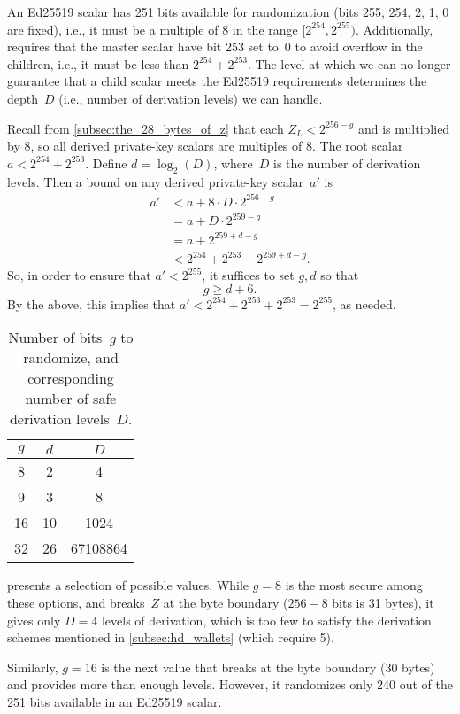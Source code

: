 \documentclass[12pt, a4paper, twocolumn]{article}
\begin{document}
An Ed25519 scalar has 251 bits available for randomization (bits 255, 254, 2, 1, 0 are fixed), i.e., it must be a multiple of 8 in the range $[2^{254},2^{255})$.
Additionally,~\cite{BIP32-Ed25519} requires that the master scalar have bit 253 set to~0 to avoid overflow in the children, i.e., it must be less than $2^{254} + 2^{253}$.
The level at which we can no longer guarantee that a child scalar meets the Ed25519 requirements determines the depth~$D$ (i.e., number of derivation levels) we can handle.

Recall from \cref{subsec:the_28_bytes_of_z} that each $Z_L < 2^{256 - g}$ and is multiplied by 8, so all derived private-key scalars are multiples of 8.
The root scalar $a < 2^{254} + 2^{253}$.
Define $d = \log_2(D)$, where~$D$ is the number of derivation levels.
Then a bound on any derived private-key scalar~$a'$ is
\begin{align*}
  a' &< a + 8\cdot D\cdot2^{256 - g} \\
     &= a + D \cdot 2^{259 - g} \\
     &= a + 2^{259 + d - g} \\
     &< 2^{254} + 2^{253} + 2^{259 + d - g} .
\end{align*}
So, in order to ensure that $a' < 2^{255}$, it suffices to set $g,d$ so that
\[ g \geq d + 6 .
\]
By the above, this implies that $a' < 2^{254} + 2^{253} + 2^{253} = 2^{255}$, as needed.

\begin{table}[h]
  \centering
  \begin{tabular}{ccc}
    \toprule
    $g$ & $d$ & $D$ \\
    \midrule
    8 & 2 & 4 \\
    9 & 3 & 8 \\
    16 & 10 & 1024 \\
    32 & 26 & 67108864 \\
    \bottomrule
  \end{tabular}
  \caption{Number of bits~$g$ to randomize, and corresponding number of safe derivation levels~$D$.}\label{tab:g_and_d}
\end{table}

 presents a selection of possible values.
While $g=8$ is the most secure among these options, and breaks~$Z$ at the byte boundary ($256-8$ bits is 31 bytes), it gives only $D=4$ levels of derivation, which is too few to satisfy the derivation schemes mentioned in \cref{subsec:hd_wallets} (which require 5).

Similarly, $g=16$ is the next value that breaks at the byte boundary (30 bytes) and provides more than enough levels.
However, it randomizes only 240 out of the 251 bits available in an Ed25519 scalar.
\end{document}
